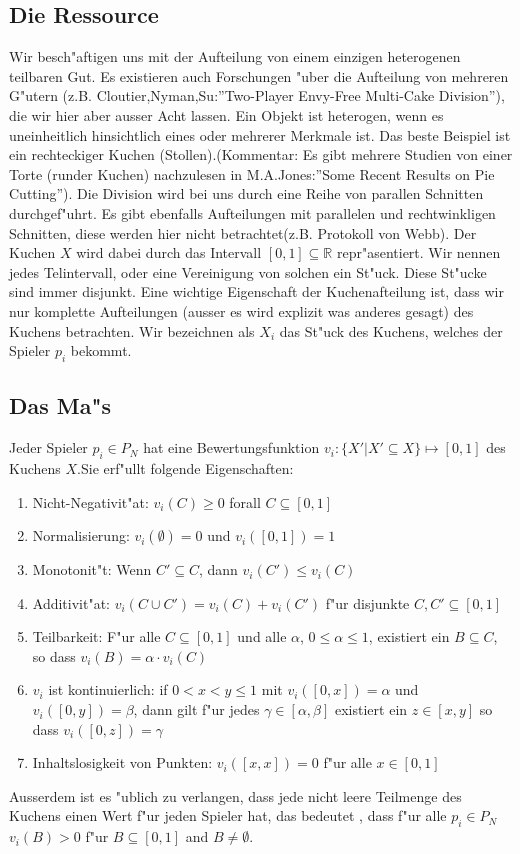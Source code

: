 \documentclass[11pt, a4paper, twoside]{article}
\numberwithin{equation}{section}
\begin{document}
\subsection{Die Ressource}
Wir besch"aftigen uns mit der Aufteilung von einem einzigen heterogenen teilbaren Gut. Es existieren auch Forschungen "uber die Aufteilung von mehreren G"utern (z.B. Cloutier,Nyman,Su:''Two-Player Envy-Free Multi-Cake Division''), die wir hier aber ausser Acht lassen. Ein Objekt ist heterogen, wenn es uneinheitlich hinsichtlich eines oder mehrerer Merkmale ist. Das beste Beispiel ist ein rechteckiger Kuchen (Stollen).(Kommentar: Es gibt mehrere Studien von einer Torte (runder Kuchen) nachzulesen in M.A.Jones:''Some Recent Results on Pie Cutting''). Die Division wird bei uns durch eine Reihe von parallen Schnitten durchgef"uhrt. Es gibt ebenfalls Aufteilungen mit parallelen und rechtwinkligen Schnitten, diese werden hier nicht betrachtet(z.B. Protokoll von Webb). Der Kuchen $X$ wird dabei durch das Intervall $[0,1]\subseteq \mathbb{R}$ repr"asentiert. Wir nennen jedes Telintervall, oder eine Vereinigung von solchen ein St"uck. Diese St"ucke sind immer disjunkt. Eine wichtige Eigenschaft der Kuchenafteilung ist, dass wir nur komplette Aufteilungen (ausser es wird explizit was anderes gesagt) des Kuchens betrachten. Wir bezeichnen als $X_i$ das St"uck des Kuchens, welches der Spieler $p_i$ bekommt.
\subsection{Das Ma"s} 
Jeder Spieler $p_i \in P_N$ hat eine Bewertungsfunktion $v_i:\{X'|X'\subseteq X\}\mapsto [0,1]$ des Kuchens $X$.Sie erf"ullt folgende Eigenschaften:
\begin{enumerate}
\item Nicht-Negativit"at: $v_i(C)\geq 0$ forall $C\subseteq [0,1]$
\item Normalisierung: $v_i(\emptyset)=0$ und $v_i([0,1])=1$
\item Monotonit"t: Wenn $C' \subseteq C$, dann $v_i(C') \leq v_i(C)$
\item Additivit"at: $v_i(C \cup C')=v_i(C)+v_i(C')$ f"ur disjunkte $C,C'\subseteq [0,1]$
\item Teilbarkeit: F"ur alle $C\subseteq [0,1]$ und alle $\alpha$, $0\leq \alpha \leq 1$, existiert ein $B\subseteq C$, so dass  $v_i(B)=\alpha \cdot v_i(C)$
\item  $v_i$ ist kontinuierlich: if $0<x<y\leq 1$ mit $v_i([0,x])=\alpha$ und $v_i([0,y])=\beta$, dann gilt f"ur jedes $\gamma \in [\alpha,\beta]$ existiert ein $z \in [x,y]$ so dass $v_i([0,z])=\gamma$
\item Inhaltslosigkeit von Punkten:  $v_i([x,x])=0$ f"ur alle $x\in [0,1]$
\end{enumerate}
Ausserdem ist es "ublich zu verlangen, dass jede nicht leere Teilmenge des Kuchens einen Wert f"ur jeden Spieler hat, das bedeutet , dass f"ur alle $p_i \in P_N$ $v_i(B)>0$ f"ur $B\subseteq [0,1]$ and $B \neq \emptyset$.
\end{document}
